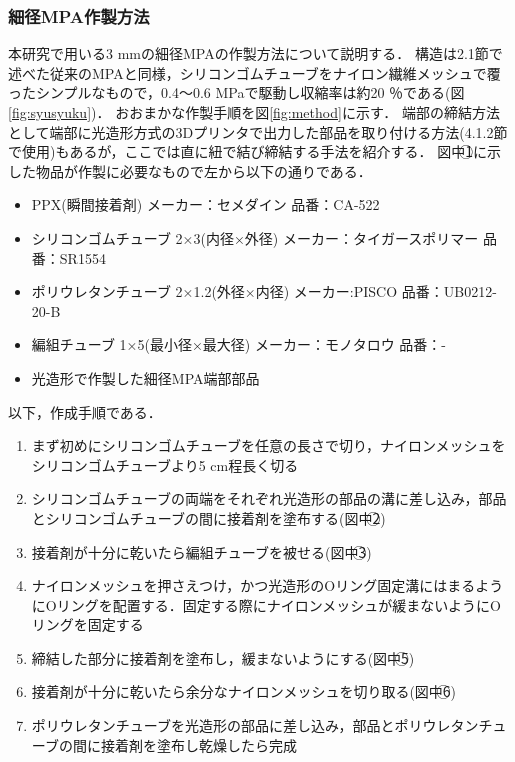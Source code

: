 \subsubsection{細径MPA作製方法}
本研究で用いる3 mmの細径MPAの作製方法について説明する．
構造は2.1節で述べた従来のMPAと同様，シリコンゴムチューブをナイロン繊維メッシュで覆ったシンプルなもので，0.4～0.6 MPaで駆動し収縮率は約20 ％である(図\ref{fig:syusyuku})．
おおまかな作製手順を図\ref{fig:method}に示す．
端部の締結方法として端部に光造形方式の3Dプリンタで出力した部品を取り付ける方法(4.1.2節で使用)もあるが，ここでは直に紐で結び締結する手法を紹介する．
図中\textcircled{\scriptsize 1}に示した物品が作製に必要なもので左から以下の通りである．
%
\begin{itemize}
  \item PPX(瞬間接着剤) メーカー：セメダイン 品番：CA-522
  \item シリコンゴムチューブ 2×3(内径×外径) メーカー：タイガースポリマー 品番：SR1554
  \item ポリウレタンチューブ 2×1.2(外径×内径) メーカー:PISCO 品番：UB0212-20-B
  \item 編組チューブ 1×5(最小径×最大径) メーカー：モノタロウ 品番：-
  \item 光造形で作製した細径MPA端部部品
\end{itemize}
%
以下，作成手順である．
%
\begin{enumerate}
  \item まず初めにシリコンゴムチューブを任意の長さで切り，ナイロンメッシュをシリコンゴムチューブより5 cm程長く切る
  \item シリコンゴムチューブの両端をそれぞれ光造形の部品の溝に差し込み，部品とシリコンゴムチューブの間に接着剤を塗布する(図中\textcircled{\scriptsize 2})
  \item 接着剤が十分に乾いたら編組チューブを被せる(図中\textcircled{\scriptsize 3})
  \item ナイロンメッシュを押さえつけ，かつ光造形のOリング固定溝にはまるようにOリングを配置する．固定する際にナイロンメッシュが緩まないようにOリングを固定する
  \item 締結した部分に接着剤を塗布し，緩まないようにする(図中\textcircled{\scriptsize 5})
  \item 接着剤が十分に乾いたら余分なナイロンメッシュを切り取る(図中\textcircled{\scriptsize 6})
  \item ポリウレタンチューブを光造形の部品に差し込み，部品とポリウレタンチューブの間に接着剤を塗布し乾燥したら完成
\end{enumerate}
%
